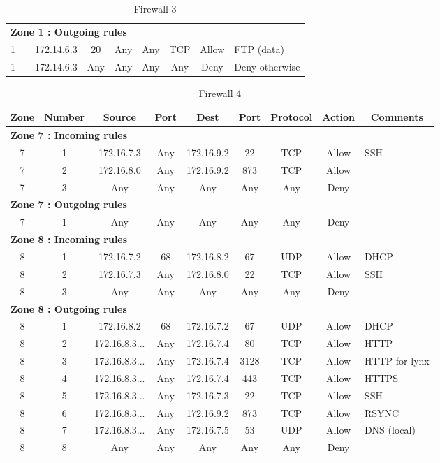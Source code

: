 \documentclass[a4paper,titlepage]{article}
\begin{document}
\begin{landscape}
\begin{table}[h]
\begin{tabular}{c|c|cc|cc|ccl}
			\hline
			\multicolumn{9}{l}{\textbf{Zone 1 : Outgoing rules}}\\
			1 &  & 172.14.6.3 & 20 & Any & Any & TCP & Allow & FTP (data)\\
			1 &  & 172.14.6.3 & Any & Any & Any & Any & Deny & Deny otherwise\\
		\end{tabular}
		\caption{Firewall 3}
	\end{table}
	\vspace*{\fill}
\end{landscape}




\begin{table}[h]
	\center
	\begin{tabular}{c|c|cc|cc|ccl}
		Zone & Number & Source & Port & Dest & Port & Protocol & Action & \multicolumn{1}{c}{Comments}\\
		\hline
		\multicolumn{9}{l}{\textbf{Zone 7 : Incoming rules}}\\
		7 & 1 & 172.16.7.3 & Any & 172.16.9.2 & 22 & TCP & Allow & SSH\\
		7 & 2 & 172.16.8.0 & Any & 172.16.9.2 & 873 & TCP & Allow & \\
		7 & 3 & Any & Any & Any & Any & Any & Deny & \\
		\hline
		\multicolumn{9}{l}{\textbf{Zone 7 : Outgoing rules}}\\
		7 & 1 & Any & Any & Any & Any & Any & Deny & \\
		
		\hline
		\multicolumn{9}{l}{\textbf{Zone 8 : Incoming rules}}\\
		8 & 1 & 172.16.7.2 & 68 &  172.16.8.2 & 67 & UDP & Allow & DHCP\\
		8 & 2 & 172.16.7.3 & Any & 172.16.8.0 & 22 & TCP & Allow & SSH \\
		8 & 3 & Any & Any & Any & Any & Any & Deny & \\
		\hline
		\multicolumn{9}{l}{\textbf{Zone 8 : Outgoing rules}}\\
		8 & 1 & 172.16.8.2 & 68 & 172.16.7.2 & 67 & UDP & Allow & DHCP\\
		8 & 2 & 172.16.8.3... & Any & 172.16.7.4 & 80 & TCP & Allow & HTTP \\
		8 & 3 & 172.16.8.3... & Any & 172.16.7.4 & 3128 & TCP & Allow & HTTP for lynx\\
		8 & 4 & 172.16.8.3... & Any & 172.16.7.4 & 443 & TCP & Allow & HTTPS \\
		8 & 5 & 172.16.8.3... & Any & 172.16.7.3 & 22 & TCP & Allow & SSH \\
		8 & 6 & 172.16.8.3... & Any & 172.16.9.2 & 873 & TCP & Allow & RSYNC \\
		8 & 7 & 172.16.8.3... & Any & 172.16.7.5 & 53 & UDP & Allow & DNS (local) \\
		8 & 8 & Any & Any & Any & Any & Any & Deny & \\
		\hline
		
	\end{tabular}
	\caption{Firewall 4}
\end{table}
\end{document}
